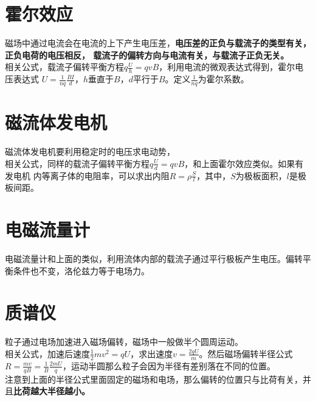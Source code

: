 \documentclass[a4paper, 12pt]{article}
\begin{document}
\section{霍尔效应}
磁场中通过电流会在电流的上下产生电压差，\textbf{电压差的正负与载流子的类型有关，正负电荷的电压相反，
载流子的偏转方向与电流有关，与载流子正负无关。}\\
相关公式，载流子偏转平衡方程$q\frac{U}{h}=qvB$，利用电流的微观表达式得到，霍尔电压表达式
$U=\frac1{nq}\frac{BI}{d}$，$h$垂直于$B$，$d$平行于$B$。定义$\frac1{nq}$为霍尔系数。
\section{磁流体发电机}
磁流体发电机要利用稳定时的电压求电动势，\\
相关公式，同样的载流子偏转平衡方程$q\frac{U}{d}=qvB$，和上面霍尔效应类似。如果有发电机
内等离子体的电阻率，可以求出内阻$R=\rho \frac Sl$，其中，$S$为极板面积，$l$是极板间距。
\section{电磁流量计}
电磁流量计和上面的类似，利用流体内部的载流子通过平行极板产生电压。偏转平衡条件也不变，洛伦兹力等于电场力。\\
\section{质谱仪}
粒子通过电场加速进入磁场偏转，磁场中一般做半个圆周运动。\\
相关公式，加速后速度$\frac12mv^2=qU$，求出速度$v=\frac{2qU}{m}$。然后磁场偏转半径公式
$R=\frac{mv}{qB}=\frac1B\frac{2mU}{q}$，运动半圆那么粒子会因为半径有差别落在不同的位置。\\
注意到上面的半径公式里面固定的磁场和电场，那么偏转的位置只与比荷有关，并且\textbf{比荷越大半径越小。}
\end{document}
